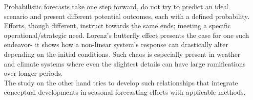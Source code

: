 Probabilistic forecasts take one step forward, do not try to predict an ideal scenario and present different potential outcomes, each with a defined probability. Efforts, though different, instruct towards the same ends; meeting a specific operational/strategic need. Lorenz’s butterfly effect presents the case for one such endeavor- it shows how a non-linear system’s response can drastically alter depending on the initial conditions. Such chaos is especially present in weather and climate systems where even the slightest details can have large ramifications over longer periods.\\

The study on the other hand tries to develop such relationships that integrate conceptual developments in seasonal forecasting efforts with applicable methods.